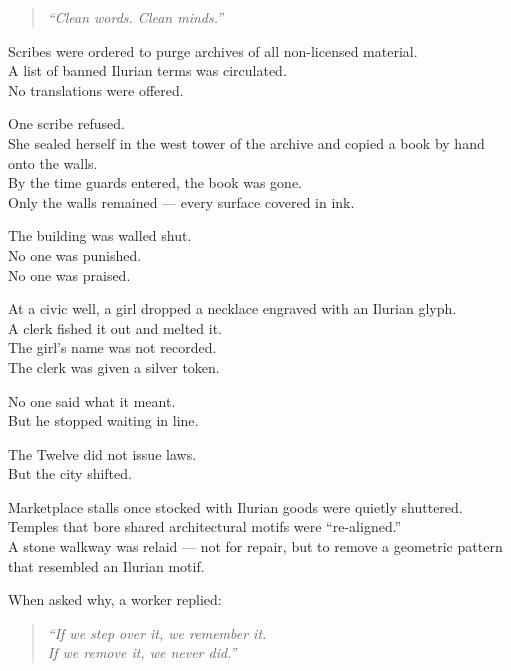 \documentclass[12pt]{article}
\begin{document}
\begin{quote}
\textit{“Clean words. Clean minds.”}
\end{quote}

\vspace{1em}

Scribes were ordered to purge archives of all non-licensed material.\\
A list of banned Ilurian terms was circulated.\\
No translations were offered.

One scribe refused.\\
She sealed herself in the west tower of the archive and copied a book by hand onto the walls.\\
By the time guards entered, the book was gone.\\
Only the walls remained — every surface covered in ink.

The building was walled shut.\\
No one was punished.\\
No one was praised.

\vspace{1em}

At a civic well, a girl dropped a necklace engraved with an Ilurian glyph.\\
A clerk fished it out and melted it.\\
The girl’s name was not recorded.\\
The clerk was given a silver token.

No one said what it meant.\\
But he stopped waiting in line.

\vspace{1em}

The Twelve did not issue laws.\\
But the city shifted.

Marketplace stalls once stocked with Ilurian goods were quietly shuttered.\\
Temples that bore shared architectural motifs were “re-aligned.”\\
A stone walkway was relaid — not for repair, but to remove a geometric pattern that resembled an Ilurian motif.

When asked why, a worker replied:

\begin{quote}
\textit{“If we step over it, we remember it.}\\
\textit{If we remove it, we never did.”}
\end{quote}
\end{document}
